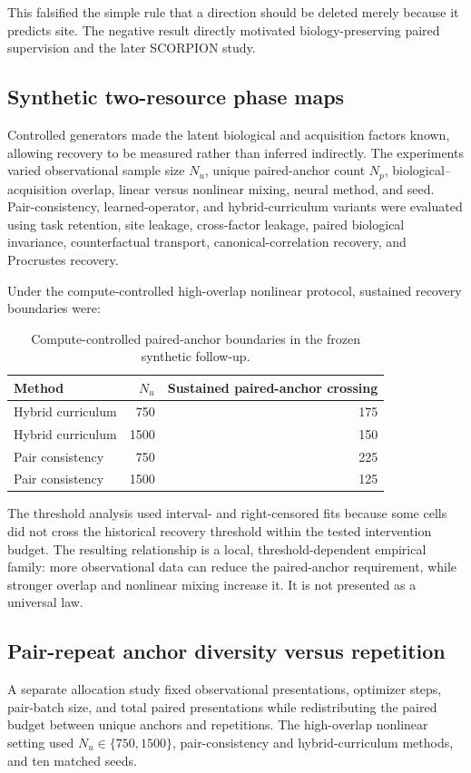 This falsified the simple rule that a direction should be deleted merely because it predicts site. The negative result directly motivated biology-preserving paired supervision and the later SCORPION study.

\subsection{Synthetic two-resource phase maps}
Controlled generators made the latent biological and acquisition factors known, allowing recovery to be measured rather than inferred indirectly. The experiments varied observational sample size $N_u$, unique paired-anchor count $N_p$, biological--acquisition overlap, linear versus nonlinear mixing, neural method, and seed. Pair-consistency, learned-operator, and hybrid-curriculum variants were evaluated using task retention, site leakage, cross-factor leakage, paired biological invariance, counterfactual transport, canonical-correlation recovery, and Procrustes recovery.

Under the compute-controlled high-overlap nonlinear protocol, sustained recovery boundaries were:
\begin{table}[!htbp]
\centering
\caption{Compute-controlled paired-anchor boundaries in the frozen synthetic follow-up.}
\small
\begin{tabular}{lrr}
\toprule
Method & $N_u$ & Sustained paired-anchor crossing \\
\midrule
Hybrid curriculum & 750 & 175 \\
Hybrid curriculum & 1500 & 150 \\
Pair consistency & 750 & 225 \\
Pair consistency & 1500 & 125 \\
\bottomrule
\end{tabular}
\label{tab:synthetic_boundaries}
\end{table}
\FloatBarrier

The threshold analysis used interval- and right-censored fits because some cells did not cross the historical recovery threshold within the tested intervention budget. The resulting relationship is a local, threshold-dependent empirical family: more observational data can reduce the paired-anchor requirement, while stronger overlap and nonlinear mixing increase it. It is not presented as a universal law.

\subsection{Pair-repeat anchor diversity versus repetition}
A separate allocation study fixed observational presentations, optimizer steps, pair-batch size, and total paired presentations while redistributing the paired budget between unique anchors and repetitions. The high-overlap nonlinear setting used $N_u\in\{750,1500\}$, pair-consistency and hybrid-curriculum methods, and ten matched seeds.

